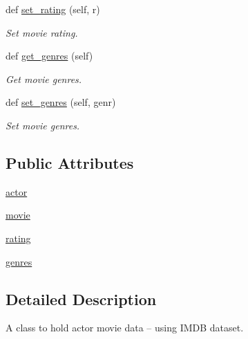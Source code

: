 \begin{DoxyCompactItemize}
def \mbox{\hyperlink{classbridges_1_1data__src__dependent_1_1actor__movie__imdb_1_1_actor_movie_i_m_d_b_a35d08b5ab9b9a616b078fe025ef8089d}{set\+\_\+rating}} (self, r)
\begin{DoxyCompactList}\small\item\em Set movie rating. \end{DoxyCompactList}\item 
def \mbox{\hyperlink{classbridges_1_1data__src__dependent_1_1actor__movie__imdb_1_1_actor_movie_i_m_d_b_ae95692483f661d1accb4a226296df320}{get\+\_\+genres}} (self)
\begin{DoxyCompactList}\small\item\em Get movie genres. \end{DoxyCompactList}\item 
def \mbox{\hyperlink{classbridges_1_1data__src__dependent_1_1actor__movie__imdb_1_1_actor_movie_i_m_d_b_ad8180e40d7c4f0036fba951134d4e02d}{set\+\_\+genres}} (self, genr)
\begin{DoxyCompactList}\small\item\em Set movie genres. \end{DoxyCompactList}\end{DoxyCompactItemize}
\subsection*{Public Attributes}
\begin{DoxyCompactItemize}
\item 
\mbox{\hyperlink{classbridges_1_1data__src__dependent_1_1actor__movie__imdb_1_1_actor_movie_i_m_d_b_a2c7d522228ae6d01690d642678575f14}{actor}}
\item 
\mbox{\hyperlink{classbridges_1_1data__src__dependent_1_1actor__movie__imdb_1_1_actor_movie_i_m_d_b_ae228f13e733c6bab2b363056178e11b0}{movie}}
\item 
\mbox{\hyperlink{classbridges_1_1data__src__dependent_1_1actor__movie__imdb_1_1_actor_movie_i_m_d_b_a670e7f62f9f828002d9e6199af73e6a8}{rating}}
\item 
\mbox{\hyperlink{classbridges_1_1data__src__dependent_1_1actor__movie__imdb_1_1_actor_movie_i_m_d_b_a74288a1d1f4f47451adbe8f84e7dca38}{genres}}
\end{DoxyCompactItemize}


\subsection{Detailed Description}
A class to hold actor movie data -- using I\+M\+DB dataset. 

